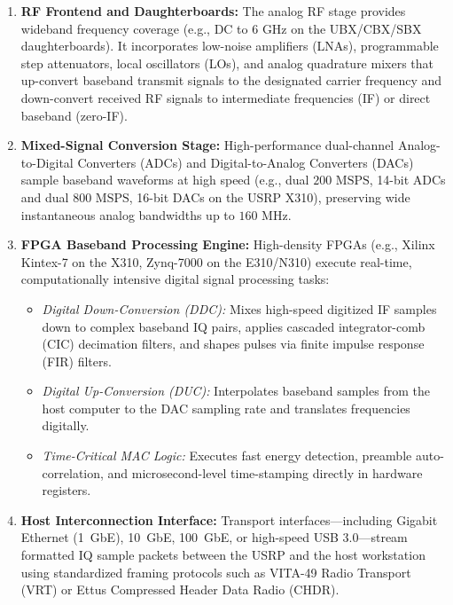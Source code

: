 \begin{enumerate}
    \item \textbf{RF Frontend and Daughterboards:} The analog RF stage provides wideband frequency coverage (e.g., DC to $6\text{~GHz}$ on the UBX/CBX/SBX daughterboards). It incorporates low-noise amplifiers (LNAs), programmable step attenuators, local oscillators (LOs), and analog quadrature mixers that up-convert baseband transmit signals to the designated carrier frequency and down-convert received RF signals to intermediate frequencies (IF) or direct baseband (zero-IF).
    \item \textbf{Mixed-Signal Conversion Stage:} High-performance dual-channel Analog-to-Digital Converters (ADCs) and Digital-to-Analog Converters (DACs) sample baseband waveforms at high speed (e.g., dual $200\text{~MSPS}$, 14-bit ADCs and dual $800\text{~MSPS}$, 16-bit DACs on the USRP X310), preserving wide instantaneous analog bandwidths up to $160\text{~MHz}$.
    \item \textbf{FPGA Baseband Processing Engine:} High-density FPGAs (e.g., Xilinx Kintex-7 on the X310, Zynq-7000 on the E310/N310) execute real-time, computationally intensive digital signal processing tasks:
    \begin{itemize}
        \item \textit{Digital Down-Conversion (DDC):} Mixes high-speed digitized IF samples down to complex baseband IQ pairs, applies cascaded integrator-comb (CIC) decimation filters, and shapes pulses via finite impulse response (FIR) filters.
        \item \textit{Digital Up-Conversion (DUC):} Interpolates baseband samples from the host computer to the DAC sampling rate and translates frequencies digitally.
        \item \textit{Time-Critical MAC Logic:} Executes fast energy detection, preamble auto-correlation, and microsecond-level time-stamping directly in hardware registers.
    \end{itemize}
    \item \textbf{Host Interconnection Interface:} Transport interfaces—including Gigabit Ethernet (1~GbE), 10~GbE, 100~GbE, or high-speed USB 3.0—stream formatted IQ sample packets between the USRP and the host workstation using standardized framing protocols such as VITA-49 Radio Transport (VRT) or Ettus Compressed Header Data Radio (CHDR).
\end{enumerate}

